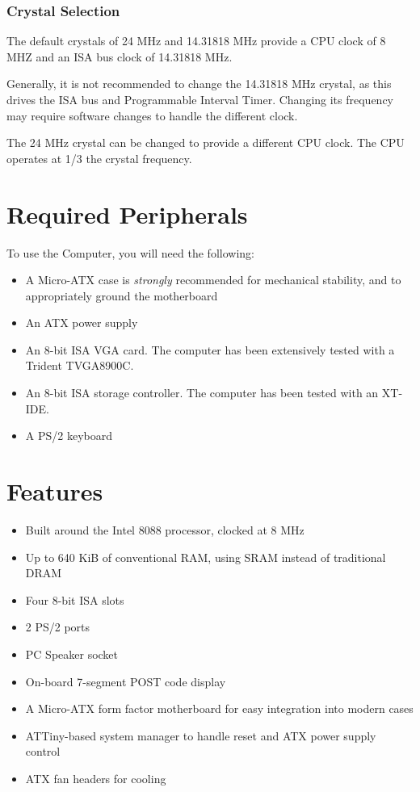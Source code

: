 \documentclass[twoside,10pt,letterpaper]{refart}
\begin{document}
\subsubsection{Crystal Selection}
The default crystals of 24 MHz and 14.31818 MHz provide a CPU clock of 8 MHZ and an ISA
bus clock of 14.31818 MHz.

Generally, it is not recommended to change the 14.31818 MHz crystal, as this drives the
ISA bus and Programmable Interval Timer. Changing its frequency may require software changes
to handle the different clock.

The 24 MHz crystal can be changed to provide a different CPU clock. The CPU operates at
1/3 the crystal frequency.

\section{Required Peripherals}
To use the  Computer, you will need the following:
\begin{itemize}
    \item A Micro-ATX case is \emph{strongly} recommended for mechanical stability, and to appropriately ground the motherboard
    \item An ATX power supply
    \item An 8-bit ISA VGA card. The computer has been extensively tested with a Trident TVGA8900C.
    \item An 8-bit ISA storage controller. The computer has been tested with an XT-IDE.
    \item A PS/2 keyboard
\end{itemize}

\section{Features}
\begin{itemize}
    \item Built around the Intel 8088 processor, clocked at 8 MHz
    \item Up to 640 KiB of conventional RAM, using SRAM instead of traditional DRAM
    \item Four 8-bit ISA slots
    \item 2 PS/2 ports
    \item PC Speaker socket
    \item On-board 7-segment POST code display
    \item A Micro-ATX form factor motherboard for easy integration into modern cases
    \item ATTiny-based system manager to handle reset and ATX power supply control
    \item ATX fan headers for cooling
\end{itemize}
\end{document}
